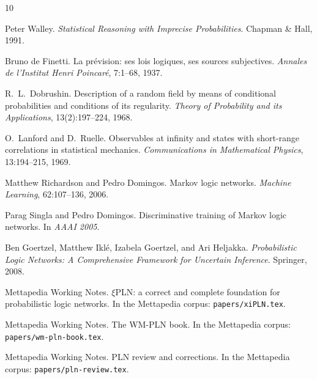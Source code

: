 \documentclass[]{article}
\newcommand{\lpath}[1]{\texttt{\nolinkurl{#1}}}
\begin{document}

\begin{thebibliography}{10}

Peter Walley.
\newblock \emph{Statistical Reasoning with Imprecise Probabilities}.
\newblock Chapman \& Hall, 1991.

Bruno de Finetti.
\newblock La pr\'evision: ses lois logiques, ses sources subjectives.
\newblock \emph{Annales de l'Institut Henri Poincar\'e}, 7:1--68, 1937.

R.\ L.\ Dobrushin.
\newblock Description of a random field by means of conditional
        probabilities and conditions of its regularity.
\newblock \emph{Theory of Probability and its Applications},
        13(2):197--224, 1968.

O.\ Lanford and D.\ Ruelle.
\newblock Observables at infinity and states with short-range correlations
        in statistical mechanics.
\newblock \emph{Communications in Mathematical Physics}, 13:194--215, 1969.

Matthew Richardson and Pedro Domingos.
\newblock Markov logic networks.
\newblock \emph{Machine Learning}, 62:107--136, 2006.

Parag Singla and Pedro Domingos.
\newblock Discriminative training of Markov logic networks.
\newblock In \emph{AAAI 2005}.

Ben Goertzel, Matthew Ikl\'e, Izabela Goertzel, and Ari Heljakka.
\newblock \emph{Probabilistic Logic Networks: A Comprehensive Framework
        for Uncertain Inference}.
\newblock Springer, 2008.

Mettapedia Working Notes.
\newblock $\xi$PLN: a correct and complete foundation for probabilistic
        logic networks.
\newblock In the Mettapedia corpus: \lpath{papers/xiPLN.tex}.

Mettapedia Working Notes.
\newblock The WM-PLN book.
\newblock In the Mettapedia corpus: \lpath{papers/wm-pln-book.tex}.

Mettapedia Working Notes.
\newblock PLN review and corrections.
\newblock In the Mettapedia corpus: \lpath{papers/pln-review.tex}.

\end{thebibliography}
\end{document}
